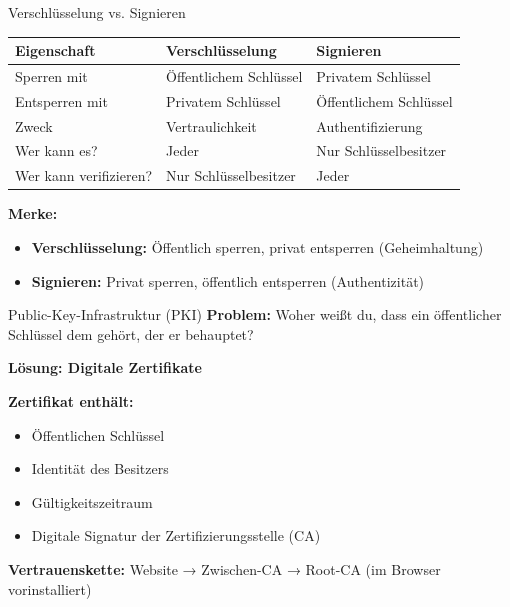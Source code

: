 \documentclass[handout]{beamer}
\begin{document}
\begin{frame}{Verschlüsselung vs. Signieren}
\begin{center}
\begin{tabular}{|l|l|l|}
\hline
\textbf{Eigenschaft} & \textbf{Verschlüsselung} & \textbf{Signieren} \\
\hline
Sperren mit & Öffentlichem Schlüssel & Privatem Schlüssel \\
Entsperren mit & Privatem Schlüssel & Öffentlichem Schlüssel \\
Zweck & Vertraulichkeit & Authentifizierung \\
Wer kann es? & Jeder & Nur Schlüsselbesitzer \\
Wer kann verifizieren? & Nur Schlüsselbesitzer & Jeder \\
\hline
\end{tabular}
\end{center}

\vspace{0.5cm}
\textbf{Merke:}
\begin{itemize}
    \item \textbf{Verschlüsselung:} Öffentlich sperren, privat entsperren (Geheimhaltung)
    \item \textbf{Signieren:} Privat sperren, öffentlich entsperren (Authentizität)
\end{itemize}
\end{frame}

\begin{frame}{Public-Key-Infrastruktur (PKI)}
\textbf{Problem:} Woher weißt du, dass ein öffentlicher Schlüssel dem gehört, der er behauptet?

\vspace{0.3cm}
\textbf{Lösung: Digitale Zertifikate}

\vspace{0.3cm}
\textbf{Zertifikat enthält:}
\begin{itemize}
    \item Öffentlichen Schlüssel
    \item Identität des Besitzers
    \item Gültigkeitszeitraum
    \item Digitale Signatur der Zertifizierungsstelle (CA)
\end{itemize}

\vspace{0.3cm}
\textbf{Vertrauenskette:}
Website → Zwischen-CA → Root-CA (im Browser vorinstalliert)

\end{frame}
\end{document}
